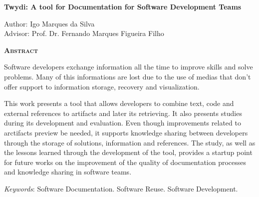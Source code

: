 \begin{center}
	{\Large{\textbf{Twydi: A tool for Documentation for Software Development Teams}}}
\end{center}

\vspace{1cm}

\begin{flushright}
	Author: Igo Marques da Silva\\
	Advisor: Prof. Dr. Fernando Marques Figueira Filho
\end{flushright}

\vspace{1cm}

\begin{center}
	\Large{\textsc{\textbf{Abstract}}}
\end{center}

\noindent Software developers exchange information all the time to improve skills and solve problems. Many of this informations are lost due to the use of medias that don't offer support to information storage, recovery and visualization.

This work presents a tool that allows developers to combine text, code and external references to artifacts and later its retrieving. It also presents studies during its development and evaluation. Even though improvements related to arctifacts preview be needed, it supports knowledge sharing between developers through the storage of solutions, information and references. The study, as well as the lessons learned through the development of the tool, provides a startup point for future works on the improvement of the quality of documentation processes and knowledge sharing in software teams.

\noindent\textit{Keywords}: Software Documentation. Software Reuse. Software Development.
